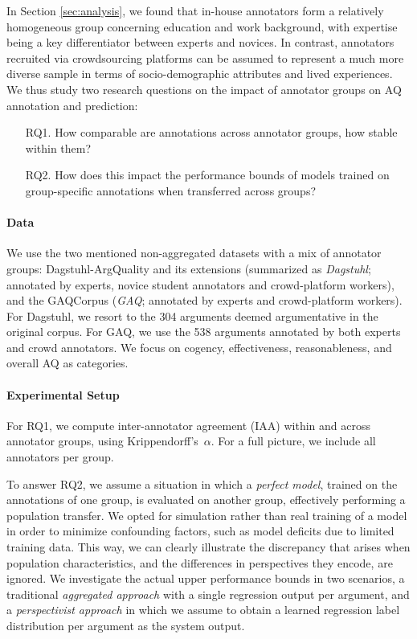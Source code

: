 In Section \ref{sec:analysis}, we found that in-house annotators form a relatively homogeneous group concerning education and work background, with expertise being a key differentiator between experts and novices. In contrast, annotators recruited via crowdsourcing platforms can be assumed to represent a much more diverse sample in terms of socio-demographic attributes and lived experiences. We thus study two research questions on the impact of annotator groups on AQ annotation and prediction:
%
\begin{enumerate}[leftmargin=1cm]
\setlength{\itemsep}{0pt}
\item[RQ1.]
How comparable are annotations across annotator groups, how stable within them?
\item[RQ2.] 
How does this impact the performance bounds of models trained on group-specific annotations when transferred across groups?
\end{enumerate}

\paragraph{Data}
We use the two mentioned non-aggregated datasets with a mix of annotator groups: Dagstuhl-ArgQuality \citep{wachsmuth-etal-2017-computational} and its extensions \cite{mirzakhmedova2024reliable, wachsmuth-etal-2017-argumentation} (summarized as \textit{Dagstuhl}; annotated by experts, novice student annotators and crowd-platform workers), and the GAQCorpus \cite{lauscher-etal-2020-rhetoric} (\textit{GAQ}; annotated by experts and crowd-platform workers). For Dagstuhl, we resort to the 304 arguments deemed argumentative in the original corpus. For GAQ, we use the 538 arguments annotated by both experts and crowd annotators. We focus on cogency, effectiveness, reasonableness, and overall AQ as categories.

\paragraph{Experimental Setup}
For RQ1, we compute inter-annotator agreement (IAA) within and across annotator groups, using Krippendorff's~$\alpha$. For a full picture, we include all annotators per group.

To answer RQ2, we assume a situation in which a \textit{perfect model}, trained on the annotations of one group, is evaluated on another group, effectively performing a {population transfer}. We opted for simulation rather than real training of a model in order to minimize confounding factors, such as model deficits due to limited training data. This way, we can clearly illustrate the discrepancy that arises when population characteristics, and the differences in perspectives they encode, are ignored. We investigate the actual upper performance bounds in two scenarios, a traditional \textit{aggregated approach} with a single regression output per argument, and a \textit{perspectivist approach} in which we assume to obtain a learned regression label distribution per argument as the system output.

